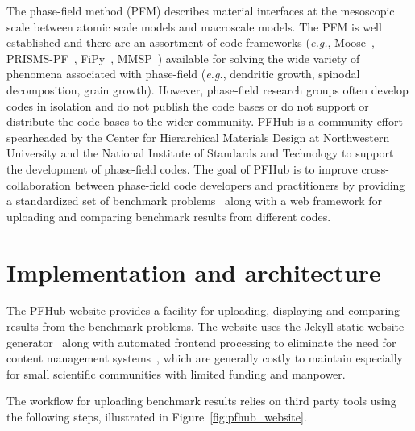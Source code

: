 \documentclass{jors}
\begin{document}
The phase-field method (PFM) describes material interfaces at the
mesoscopic scale between atomic scale models and macroscale models.
The PFM is well established and there are an assortment of code
frameworks (\emph{e.g.}, Moose~\cite{moose},
PRISMS-PF~\cite{prisms-pf}, FiPy~\cite{fipy}, MMSP~\cite{mmsp})
available for solving the wide variety of phenomena associated with
phase-field (\emph{e.g.}, dendritic growth, spinodal decomposition,
grain growth). However, phase-field research groups often develop
codes in isolation and do not publish the code bases or do not support
or distribute the code bases to the wider community. PFHub is a
community effort spearheaded by the Center for Hierarchical Materials
Design at Northwestern University and the National Institute of
Standards and Technology to support the development of phase-field
codes. The goal of PFHub is to improve cross-collaboration between
phase-field code developers and practitioners by providing a
standardized set of benchmark problems~\cite{bm1, bm2} along with a
web framework for uploading and comparing benchmark results from
different codes.

\section*{Implementation and architecture}

The PFHub website provides a facility for uploading, displaying and
comparing results from the benchmark problems. The website uses the
Jekyll static website generator~\cite{jekyll} along with automated
frontend processing to eliminate the need for content management
systems~\cite{cmsfree}, which are generally costly to maintain
especially for small scientific communities with limited funding and
manpower.

The workflow for uploading benchmark results relies on third party
tools using the following steps, illustrated in
Figure~\ref{fig:pfhub_website}.
\end{document}
